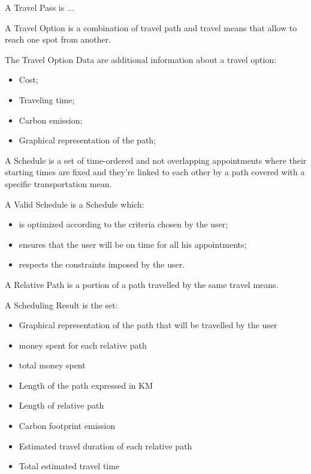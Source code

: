 \begin{definition}
A Travel Pass is  ...
\end{definition}

\begin{definition}
A Travel Option is a combination of travel path and travel means that allow to reach one spot from another.
\end{definition}

\begin{definition}
The Travel Option Data are additional information about a travel option:
\begin{itemize}
\item Cost;
\item Traveling time;
\item Carbon emission;
\item Graphical representation of the path;
\end{itemize}
\end{definition}

\begin{definition}
A Schedule is a set of time-ordered and not overlapping appointments where their starting times are fixed and they're linked to each other by a path covered with a specific transportation mean.
\end{definition}

\begin{definition}
A Valid Schedule is a Schedule which:
\begin{itemize}
\item is optimized according to the criteria chosen by the user;
\item ensures that the user will be on time for all his appointments;
\item respects the constraints imposed by the user.
\end{itemize}
\end{definition}


\begin{definition}
A Relative Path is a  portion of a path travelled by the same travel means.
\end{definition}
 

\begin{definition}
A Scheduling Result is the set:
\begin{itemize}
\item Graphical representation of the path that will be travelled by the user
\item money spent for each relative path
\item total money spent 
\item Length of the path expressed in KM
\item Length of relative path 
\item Carbon footprint emission
\item Estimated travel duration of each relative path
\item Total estimated travel time
\end{itemize}
\end{definition}

